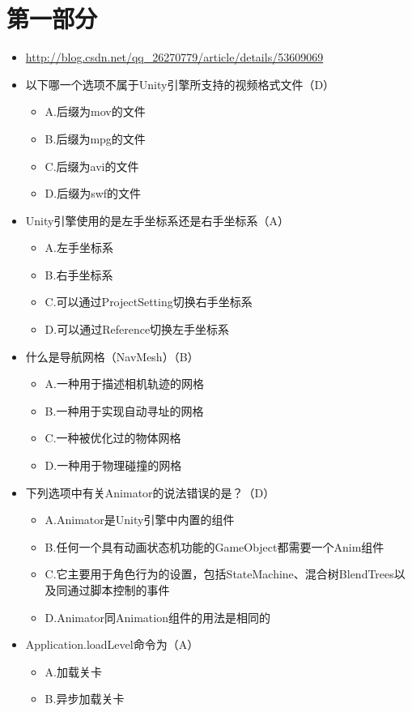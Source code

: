 \documentclass[9pt, b5paper]{article}
\begin{document}
\section{第一部分}
\label{sec:org1f1df5f}
\begin{itemize}
\item \url{http://blog.csdn.net/qq\_26270779/article/details/53609069}
\item 以下哪一个选项不属于Unity引擎所支持的视频格式文件（D）
\begin{itemize}
\item A.后缀为mov的文件
\item B.后缀为mpg的文件
\item C.后缀为avi的文件
\item D.后缀为swf的文件
\end{itemize}
\item Unity引擎使用的是左手坐标系还是右手坐标系（A）
\begin{itemize}
\item A.左手坐标系
\item B.右手坐标系
\item C.可以通过ProjectSetting切换右手坐标系
\item D.可以通过Reference切换左手坐标系
\end{itemize}
\item 什么是导航网格（NavMesh）（B）
\begin{itemize}
\item A.一种用于描述相机轨迹的网格
\item B.一种用于实现自动寻址的网格
\item C.一种被优化过的物体网格
\item D.一种用于物理碰撞的网格
\end{itemize}
\item 下列选项中有关Animator的说法错误的是？（D）
\begin{itemize}
\item A.Animator是Unity引擎中内置的组件
\item B.任何一个具有动画状态机功能的GameObject都需要一个Anim组件
\item C.它主要用于角色行为的设置，包括StateMachine、混合树BlendTrees以及同通过脚本控制的事件
\item D.Animator同Animation组件的用法是相同的
\end{itemize}
\item Application.loadLevel命令为（A）
\begin{itemize}
\item A.加载关卡
\item B.异步加载关卡

\end{itemize}
\end{itemize}
\end{document}
